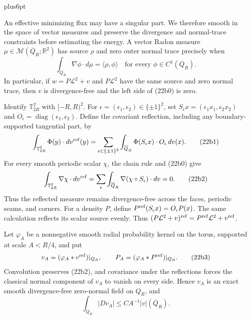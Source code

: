 \documentclass[11pt,reqno]{amsart}
\makeatletter
\theoremstyle{plain}
\theoremstyle{definition}
\theoremstyle{remark}
\renewenvironment{proof}[1][\proofname]{%
  \par
  \pushQED{\qed}%
  \normalfont
  \topsep6pt plus6pt\relax
  \trivlist
  \item[\hskip\labelsep\slshape #1\@addpunct{.}]%
  \ignorespaces
}{%
  \popQED
  \endtrivlist
  \@endpefalse
}
\DeclareRobustCommand{\qed}{%
  \leavevmode\unskip\penalty9999\hbox{}\nobreak
  \ifmmode
    \makebox[0pt][l]{\qquad\hbox{\qedsymbol}}%
  \else
    \qquad\hbox{\qedsymbol}%
  \fi
}
\renewcommand{\qedsymbol}{\rule[.47pt]{4pt}{6pt}}
\numberwithin{equation}{section}
\newcommand{\1}{\mathbf 1}
\makeatother
\begin{document}
\begin{proof}
An effective minimizing flux may have a singular part.  We therefore
smooth in the space of vector measures and preserve the divergence and
normal-trace constraints before estimating the energy.  A vector
Radon measure $\mu\in\mathcal M(\overline Q_ R;\mathbb R^2)$ has
source $\rho$ and zero outer normal trace precisely when
\begin{equation}
\int_ {\overline Q_ R}\nabla\phi\cdot d\mu
=\langle\rho,\phi\rangle
\quad\text{for every }\phi\in C^1(\overline Q_ R).
\tag{22b0}
\end{equation}
In particular, if $w=P\mathcal L^2+v$ and $P\mathcal L^2$ have
the same source and zero normal trace, then $v$ is divergence-free
and the left side of (22b0) is zero.

Identify $\mathbb T_ {2R}^2$ with $[-R,R)^2$.  For
$\epsilon=(\epsilon_ 1,\epsilon_ 2)\in\{\pm1\}^2$, set
$S_ \epsilon x=(\epsilon_ 1x_ 1,\epsilon_ 2x_ 2)$ and
$O_ \epsilon=\operatorname {diag}(\epsilon_ 1,\epsilon_ 2)$.  Define
the covariant reflection, including any boundary-supported tangential
part, by
\begin{equation}
\int_ {\mathbb T_ {2R}^2}\Phi(y)\cdot dv^{\rm ref}(y)
=\sum_ {\epsilon\in\{\pm1\}^2}\int_ {\overline Q_ R}
\Phi(S_ \epsilon x)\cdot O_ \epsilon\,dv(x).
\tag{22b1}
\end{equation}
For every smooth periodic scalar $\chi$, the chain rule and (22b0)
give
\begin{equation}
\int_ {\mathbb T_ {2R}^2}\nabla\chi\cdot dv^{\rm ref}
=\sum_ \epsilon\int_ {\overline Q_ R}
\nabla(\chi\circ S_ \epsilon)\cdot dv=0.
\tag{22b2}
\end{equation}
Thus the reflected measure remains divergence-free across the faces,
periodic seams, and corners.  For a density $P$, define
$P^{\rm ref}(S_ \epsilon x)=O_ \epsilon P(x)$.  The same calculation
reflects its scalar source evenly.  Thus
$(P\mathcal L^2+v)^{\rm ref}=P^{\rm ref}\mathcal L^2+v^{\rm ref}$.

Let $\varphi_ A$ be a nonnegative smooth radial probability kernel on
the torus, supported at scale $A<R/4$, and put
\begin{equation}
v_ A=(\varphi_ A*v^{\rm ref})|_ {Q_ R},\qquad
P_ A=(\varphi_ A*P^{\rm ref})|_ {Q_ R}.
\tag{22b3}
\end{equation}
Convolution preserves (22b2), and covariance under the reflections
forces the classical normal component of $v_ A$ to vanish on every
side.  Hence $v_ A$ is an exact smooth divergence-free zero-normal
field on $Q_ R$, and
\begin{equation}
\int_ {Q_ R}|Dv_ A|\leq CA^{-1}|v|(\overline Q_ R).
\tag{22b4}
\end{equation}


\end{proof}
\end{document}
